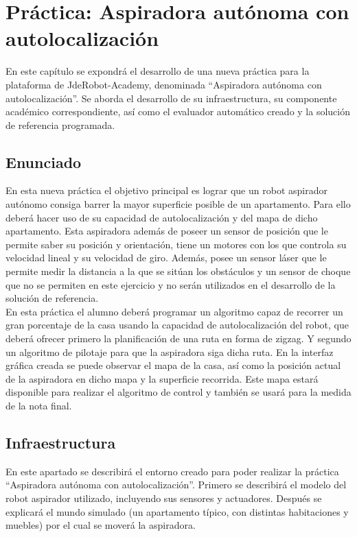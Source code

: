 \chapter{Práctica: Aspiradora autónoma con autolocalización}\label{cap.roomba}
En este capítulo se expondrá el desarrollo de una nueva práctica para la plataforma de JdeRobot-Academy, denominada ``Aspiradora autónoma con autolocalización''. Se aborda el desarrollo de su infraestructura, su componente académico correspondiente, así como el evaluador automático creado y la solución de referencia programada. 


\section{Enunciado} \label{sec.enunciado}
En esta nueva práctica el objetivo principal es lograr que un robot aspirador autónomo consiga barrer la mayor superficie posible de un apartamento. Para ello deberá hacer uso de su capacidad de autolocalización y del mapa de dicho apartamento. Esta aspiradora además de poseer un sensor de posición que le permite saber su posición y orientación, tiene un motores con los que controla su velocidad lineal y su velocidad de giro. Además, posee un sensor láser que le permite medir la distancia a la que se sitúan los obstáculos y un sensor de choque que no se permiten en este ejercicio y no serán utilizados en el desarrollo de la solución de referencia. \\

En esta práctica el alumno deberá programar un algoritmo capaz de recorrer un gran porcentaje de la casa usando la capacidad de autolocalización del robot, que deberá ofrecer primero la planificación de una ruta en forma de zigzag. Y segundo un algoritmo de pilotaje para que la aspiradora siga dicha ruta. En la interfaz gráfica creada se puede observar el mapa de la casa, así como la posición actual de la aspiradora en dicho mapa y la superficie recorrida. Este mapa estará disponible para realizar el algoritmo de control y también se usará para la medida de la nota final.


\section{Infraestructura} 
En este apartado se describirá el entorno creado para poder realizar la práctica ``Aspiradora autónoma con autolocalización''. Primero se describirá el modelo del robot aspirador utilizado, incluyendo sus sensores y actuadores. Después se explicará el mundo simulado (un apartamento típico, con distintas habitaciones y muebles) por el cual se moverá la aspiradora. 

